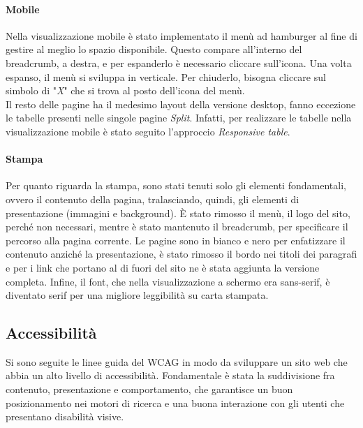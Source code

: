 \paragraph{Mobile}
Nella visualizzazione mobile è stato implementato il menù ad hamburger al fine di gestire al meglio lo spazio disponibile. Questo compare all'interno del breadcrumb, a destra, e per espanderlo è necessario cliccare sull'icona. Una volta espanso, il menù si sviluppa in verticale. Per chiuderlo, bisogna cliccare sul simbolo di "\textit{X}" che si trova al posto dell'icona del menù. \\
Il resto delle pagine ha il medesimo layout della versione desktop, fanno eccezione le tabelle presenti nelle singole pagine \textit{Split}. Infatti, per realizzare le tabelle nella visualizzazione mobile è stato seguito l'approccio \textit{Responsive table}. 
\paragraph{Stampa}
Per quanto riguarda la stampa, sono stati tenuti solo gli elementi fondamentali, ovvero il contenuto della pagina, tralasciando, quindi, gli elementi di presentazione (immagini e
background). È stato rimosso il menù, il logo del sito, perché non necessari, mentre è stato mantenuto il breadcrumb, per specificare il percorso alla pagina corrente. Le pagine sono in bianco e nero per
enfatizzare il contenuto anziché la presentazione, è stato rimosso il bordo nei titoli dei paragrafi e per i link che portano al di fuori del sito ne è stata aggiunta la versione completa. Infine, il font, che nella visualizzazione a schermo era sans-serif,  è diventato serif per una migliore leggibilità su carta stampata.

\subsection{Accessibilità}
Si sono seguite le linee guida del WCAG in modo da sviluppare un sito web che abbia un alto livello di accessibilità. Fondamentale è stata la suddivisione fra contenuto, presentazione e comportamento, che garantisce un buon posizionamento nei motori di ricerca e una buona interazione con gli utenti che presentano disabilità visive.

